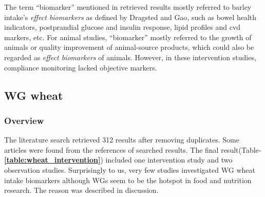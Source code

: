 
The term ``biomarker'' mentioned in retrieved results mostly referred to barley intake's \textit{effect biomarkers} as defined by Dragsted\cite{Dragsted2017} and Gao\cite{Gao2017}, such as bowel health indicators\cite{Bird2008}, postprandial glucose and insulin response\cite{Ames2015}, lipid profiles and \acrfull{cvd} markers\cite{Marungruang2018}, etc. 
For animal studies, ``biomarker'' mostly referred to the growth of animals or quality improvement of animal-source products\cite{ISI:000272990200002,Foster2003}, which could also be regarded as \textit{effect biomarkers} of animals. 
However, in these intervention studies, compliance monitoring lacked objective markers. 

\subsection{WG wheat}
\subsubsection{Overview}
The literature search retrieved 312 results after removing duplicates. Some articles were found from the references of searched results. 
The final result(Table-\textbf{\ref{table:wheat_intervention}}) included one intervention study and two observation studies.
Surprisingly to us, very few studies investigated WG wheat intake biomarkers although WGs seem to be the hotspot in food and nutrition research. The reason was described in discussion.

